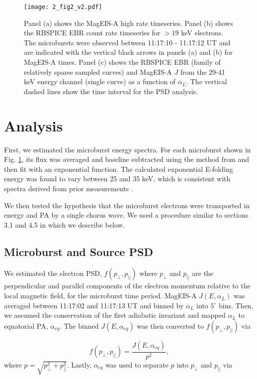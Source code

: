 \begin{figure}
\texttt{[image: 2\_fig2\_v2.pdf]}
\caption{Panel (a) shows the MagEIS-A high rate timeseries. Panel (b) shows the RBSPICE EBR count rate timeseries for $> 19$ keV electrons. The microbursts were observed between 11:17:10 - 11:17:12 UT and are indicated with the vertical black arrows in panels (a) and (b) for MagEIS-A times. Panel (c) shows the RBSPICE EBR (family of relatively sparse sampled curves) and MagEIS-A $J$ from the 29-41 keV energy channel (single curve) as a function of $\alpha_{L}$. The vertical dashed lines show the time interval for the PSD analysis.}
\label{fig2}
\end{figure}

\section{Analysis} \label{analysis} %
First, we estimated the microburst energy spectra. For each microburst shown in Fig. \ref{fig2}, its flux was averaged and baseline subtracted using the method from \citet{O'Brien2004} and then fit with an exponential function. The calculated exponential E-folding energy was found to vary between 25 and 35 keV, which is consistent with spectra derived from prior measurements \citep{Datta1997, Lee2005, Lee2012}.

We then tested the hypothesis that the microburst electrons were transported in energy and PA by a single chorus wave. We used a procedure similar to sections 3.1 and 4.5 in \citet{Meredith2002} which we describe below.

\subsection{Microburst and Source PSD} \label{psd_sec}
We estimated the electron PSD, $f(p_\perp, p_{||})$ where $p_\perp$ and $p_{||}$ are the perpendicular and parallel components of the electron momentum relative to the local magnetic field, for the microburst time period. MagEIS-A $J(E, \alpha_{L})$ was averaged between 11:17:02 and 11:17:13 UT and binned by $\alpha_{L}$ into $5^\circ$ bins. Then, we assumed the conservation of the first adiabatic invariant and mapped $\alpha_{L}$ to equatorial PA, $\alpha_{eq}$. The binned $J(E, \alpha_{eq})$ was then converted to $f(p_\perp, p_{||})$ via

\begin{equation}
f(p_\perp, p_{||}) = \frac{J(E, \alpha_{eq})}{p^2},
\label{psd_eq}
\end{equation} where $p = \sqrt{p_\perp^2 + p_{||}^2}$. Lastly, $\alpha_{eq}$ was used to separate $p$ into $p_\perp$ and $p_{||}$ via

